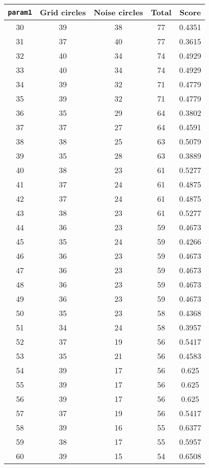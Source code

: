 \documentclass[letterpaper, 12pt]{article}
\begin{document}
\begin{longtable}{|c|c|c|c|c|}
\hline
\textbf{\texttt{param1}} & \textbf{Grid circles} & \textbf{Noise circles} & \textbf{Total} & \textbf{Score} \\
\hline
30 & 39 & 38 & 77 & 0.4351 \\
\hline
31 & 37 & 40 & 77 & 0.3615 \\
\hline
32 & 40 & 34 & 74 & 0.4929 \\
\hline
33 & 40 & 34 & 74 & 0.4929 \\
\hline
34 & 39 & 32 & 71 & 0.4779 \\
\hline
35 & 39 & 32 & 71 & 0.4779 \\
\hline
36 & 35 & 29 & 64 & 0.3802 \\
\hline
37 & 37 & 27 & 64 & 0.4591 \\
\hline
38 & 38 & 25 & 63 & 0.5079 \\
\hline
39 & 35 & 28 & 63 & 0.3889 \\
\hline
40 & 38 & 23 & 61 & 0.5277 \\
\hline
41 & 37 & 24 & 61 & 0.4875 \\
\hline
42 & 37 & 24 & 61 & 0.4875 \\
\hline
43 & 38 & 23 & 61 & 0.5277 \\
\hline
44 & 36 & 23 & 59 & 0.4673 \\
\hline
45 & 35 & 24 & 59 & 0.4266 \\
\hline
46 & 36 & 23 & 59 & 0.4673 \\
\hline
47 & 36 & 23 & 59 & 0.4673 \\
\hline
48 & 36 & 23 & 59 & 0.4673 \\
\hline
49 & 36 & 23 & 59 & 0.4673 \\
\hline
50 & 35 & 23 & 58 & 0.4368 \\
\hline
51 & 34 & 24 & 58 & 0.3957 \\
\hline
52 & 37 & 19 & 56 & 0.5417 \\
\hline
53 & 35 & 21 & 56 & 0.4583 \\
\hline
54 & 39 & 17 & 56 & 0.625 \\
\hline
55 & 39 & 17 & 56 & 0.625 \\
\hline
56 & 39 & 17 & 56 & 0.625 \\
\hline
57 & 37 & 19 & 56 & 0.5417 \\
\hline
58 & 39 & 16 & 55 & 0.6377 \\
\hline
59 & 38 & 17 & 55 & 0.5957 \\
\hline
60 & 39 & 15 & 54 & 0.6508 \\

\end{longtable}
\end{document}

